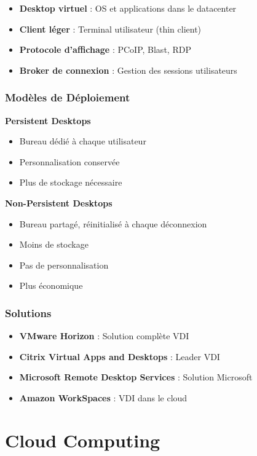 \documentclass[11pt,a4paper]{article}
\begin{document}
\begin{itemize}
    \item \textbf{Desktop virtuel} : OS et applications dans le datacenter
    \item \textbf{Client léger} : Terminal utilisateur (thin client)
    \item \textbf{Protocole d'affichage} : PCoIP, Blast, RDP
    \item \textbf{Broker de connexion} : Gestion des sessions utilisateurs
\end{itemize}

\subsubsection{Modèles de Déploiement}

\textbf{Persistent Desktops}
\begin{itemize}
    \item Bureau dédié à chaque utilisateur
    \item Personnalisation conservée
    \item Plus de stockage nécessaire
\end{itemize}

\textbf{Non-Persistent Desktops}
\begin{itemize}
    \item Bureau partagé, réinitialisé à chaque déconnexion
    \item Moins de stockage
    \item Pas de personnalisation
    \item Plus économique
\end{itemize}

\subsubsection{Solutions}

\begin{itemize}
    \item \textbf{VMware Horizon} : Solution complète VDI
    \item \textbf{Citrix Virtual Apps and Desktops} : Leader VDI
    \item \textbf{Microsoft Remote Desktop Services} : Solution Microsoft
    \item \textbf{Amazon WorkSpaces} : VDI dans le cloud
\end{itemize}

\section{Cloud Computing}
\end{document}
